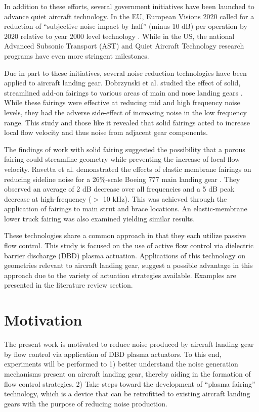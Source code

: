 In addition to these efforts, several government initiatives have been launched to advance quiet aircraft technology. In the EU, European Visions 2020 called for a reduction of ``subjective noise impact by half'' (minus 10 dB) per operation by 2020 relative to year 2000 level technology \cite{busquin2001}. While in the US, the national Advanced Subsonic Transport (AST) and Quiet Aircraft Technology research programs have even more stringent milestones.

Due in part to these initiatives, several noise reduction technologies have been applied to aircraft landing gear. 
Dobrzynski et al. studied the effect of solid, streamlined add-on fairings to various areas of main and nose landing gears \cite{dob2002}. While these fairings were effective at reducing mid and high frequency noise levels, they had the adverse side-effect of increasing noise in the low frequency range. This study and those like it revealed that solid fairings acted to increase local flow velocity and thus noise from adjacent gear components.

The findings of work with solid fairing suggested the possibility that a porous fairing could streamline geometry while preventing the increase of local flow velocity.
Ravetta et al. demonstrated the effects of elastic membrane fairings on reducing sideline noise for a 26\%-scale Boeing 777 main landing gear \cite{ravetta2008}. They observed an average of 2 dB decrease over all frequencies and a 5 dB peak decrease at high-frequency ($>$ 10 kHz). This was achieved through the application of fairings to main strut and brace locations. An elastic-membrane lower truck fairing was also examined yielding similar results.

These technologies share a common approach in that they each utilize passive flow control. This study is focused on the use of active flow control via dielectric barrier discharge (DBD) plasma actuation. Applications of this technology on geometries relevant to aircraft landing gear, suggest a possible advantage in this approach due to the variety of actuation strategies available. Examples are presented in the literature review section.

\section{Motivation}
The present work is motivated to reduce noise produced by aircraft landing gear by flow control via application of DBD plasma actuators. To this end, experiments will be performed to 
1) better understand the noise generation mechanisms present on aircraft landing gear, thereby aiding in the formation of flow control strategies.
2) Take steps toward the development of ``plasma fairing'' technology, which is a device that can be retrofitted to existing aircraft landing gears with the purpose of reducing noise production.

